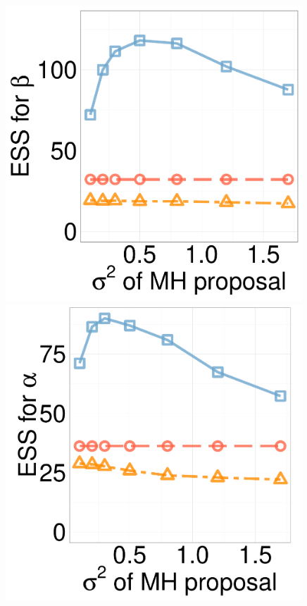 \begin{figure}[H]
\begin{minipage}[!hp]{0.24\linewidth}
\end{minipage}
  \begin{minipage}[hp]{0.24\linewidth}
  \centering
    \includegraphics [width=0.99\textwidth, angle=0]{figs/ess/QC_D3beta_k2.pdf}
	\end{minipage}
  \begin{minipage}[hp]{0.24\linewidth}
  \centering
    \includegraphics [width=0.99\textwidth, angle=0]{figs/ess/QC_D10alpha_k2.pdf}

\end{minipage}
\end{figure}
